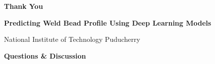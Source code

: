 \documentclass[aspectratio=169]{beamer}
\begin{document}
\begin{frame}
	\centering
	\Huge \textbf{\color{blue!80!black}Thank You}
	
	\vspace{0.4cm}
	\large \textbf{Predicting Weld Bead Profile Using Deep Learning Models}
	
	\vspace{0.2cm}
	\normalsize National Institute of Technology Puducherry
	
	\vspace{0.6cm}
	\Large \textbf{Questions \& Discussion}
\end{frame}
\end{document}
